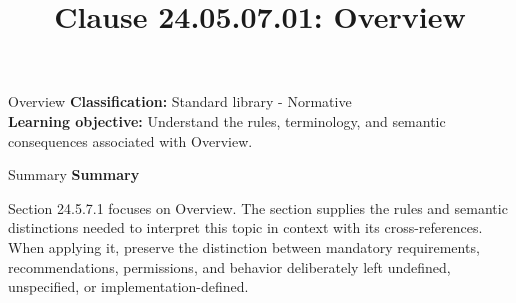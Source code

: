 \documentclass[10pt,letterpaper]{article}
\title{Clause 24.05.07.01: Overview}
\author{}
\date{}
\begin{document}
\maketitle
\begin{CornellOverviewBox}{Overview}
\textbf{Classification:} Standard library - Normative\\[2pt]
\textbf{Learning objective:} Understand the rules, terminology, and semantic consequences associated with Overview.
\end{CornellOverviewBox}\begin{CornellSummaryBox}{Summary}
{\sffamily\bfseries\color{Accent} Summary}\par\vspace{3pt}Section 24.5.7.1 focuses on Overview. The section supplies the rules and semantic distinctions needed to interpret this topic in context with its cross-references. When applying it, preserve the distinction between mandatory requirements, recommendations, permissions, and behavior deliberately left undefined, unspecified, or implementation-defined.
\end{CornellSummaryBox}
\end{document}
